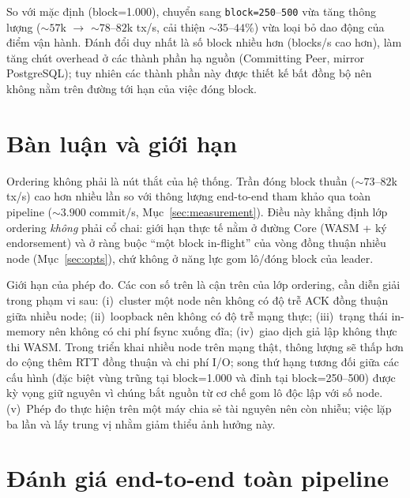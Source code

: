 So với mặc định (block=1.000), chuyển sang \texttt{block=250}--\texttt{500} vừa
tăng thông lượng (${\sim}57$k $\to$ ${\sim}78$--$82$k tx/s, cải thiện
${\sim}35$--$44\%$) vừa loại bỏ dao động của điểm vận hành. Đánh đổi duy
nhất là số block nhiều hơn (blocks/s cao hơn), làm tăng chút overhead ở các thành
phần hạ nguồn (Committing Peer, mirror PostgreSQL); tuy nhiên các thành phần này
được thiết kế bất đồng bộ nên không nằm trên đường tới hạn của việc đóng block.

\section{Bàn luận và giới hạn}
\label{sec:eval-threats}

Ordering không phải là nút thắt của hệ thống. Trần đóng block thuần
(${\sim}73$--$82$k tx/s) cao hơn nhiều lần so với thông lượng end-to-end tham khảo
qua toàn pipeline (${\sim}3.900$ commit/s, Mục~\ref{sec:measurement}). Điều này
khẳng định lớp ordering \textit{không} phải cổ chai: giới hạn thực tế nằm ở
đường Core (WASM + ký endorsement) và ở ràng buộc ``một block in-flight'' của vòng
đồng thuận nhiều node (Mục~\ref{sec:opts}), chứ không ở năng lực gom lô/đóng block
của leader.

Giới hạn của phép đo. Các con số trên là cận trên của lớp
ordering, cần diễn giải trong phạm vi sau: (i)~cluster một node nên không có độ
trễ ACK đồng thuận giữa nhiều node; (ii)~loopback nên không có độ trễ mạng thực;
(iii)~trạng thái in-memory nên không có chi phí fsync xuống đĩa; (iv)~giao dịch
giả lập không thực thi WASM. Trong triển khai nhiều node trên mạng thật, thông
lượng sẽ thấp hơn do cộng thêm RTT đồng thuận và chi phí I/O; song thứ hạng tương
đối giữa các cấu hình (đặc biệt vùng trũng tại block=1.000 và đỉnh tại
block=250--500) được kỳ vọng giữ nguyên vì chúng bắt nguồn từ cơ chế gom lô độc
lập với số node. (v)~Phép đo thực hiện trên một máy chia sẻ tài nguyên nên còn
nhiễu; việc lặp ba lần và lấy trung vị nhằm giảm thiểu ảnh hưởng này.


\section{Đánh giá end-to-end toàn pipeline}
\label{sec:e2e-eval}

